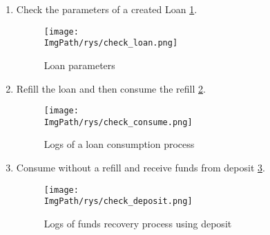 \documentclass[a4paper,12pt,twoside,openany]{report}
\newcommand{\ImgPath}{.}
\begin{document}
\begin{enumerate}
\item Check the parameters of a created Loan \ref{check loan}.

\begin{figure}[!htbp]
	\begin{center}
\centering
\texttt{[image: \\ImgPath/rys/check\_loan.png]}
\end{center}
	\caption{Loan parameters}
	\label{check loan}
\end{figure}

\item Refill the loan and then consume the refill \ref{check consume}.

\begin{figure}[!htbp]
	\begin{center}
\centering
\texttt{[image: \\ImgPath/rys/check\_consume.png]}
\end{center}
	\caption{Logs of a loan consumption process}
	\label{check consume}
\end{figure}

\item Consume without a refill and receive funds from deposit \ref{check deposit}.

\begin{figure}[!htbp]
	\begin{center}
\centering
\texttt{[image: \\ImgPath/rys/check\_deposit.png]}
\end{center}
	\caption{Logs of funds recovery process using deposit}
	\label{check deposit}
\end{figure}

\end{enumerate}
\end{document}
